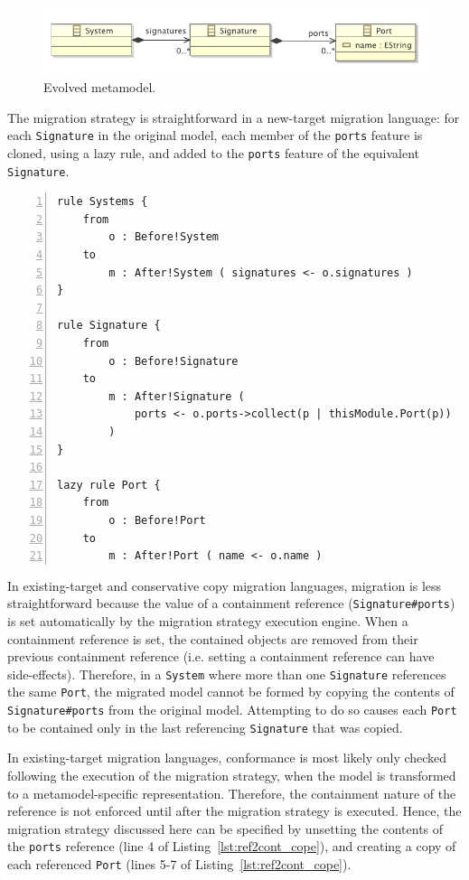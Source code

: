 \begin{figure}[htbp]
  \centering
  \includegraphics[scale=0.75]{6.Evaluation/images/change_ref_to_cont_after.pdf}
  \caption{Evolved metamodel.}
  \label{fig:ref2cont_evolved_mm}
\end{figure}

The migration strategy is straightforward in a new-target migration language: for each \texttt{Signature} in the original model, each member of the \texttt{ports} feature is cloned, using a lazy rule, and added to the \texttt{ports} feature of the equivalent \texttt{Signature}.

\begin{lstlisting}[basicstyle=\ttfamily\footnotesize, flexiblecolumns=true, numbers=left, nolol=true, caption=Change R to C model migration in ATL, label=lst:ref2cont_atl, language=ATL, tabsize=2]
rule Systems {
	from
		o : Before!System
	to
		m : After!System ( signatures <- o.signatures )
}

rule Signature {
	from
		o : Before!Signature
	to
		m : After!Signature (
			ports <- o.ports->collect(p | thisModule.Port(p))
		)
}

lazy rule Port {
	from
		o : Before!Port
	to
		m : After!Port ( name <- o.name )
\end{lstlisting}

In existing-target and conservative copy migration languages, migration is less straightforward because the value of a containment reference (\texttt{Signature\#ports}) is set automatically by the migration strategy execution engine. When a containment reference is set, the contained objects are removed from their previous containment reference (i.e. setting a containment reference can have side-effects). Therefore, in a \texttt{System} where more than one \texttt{Signature} references the same \texttt{Port}, the migrated model cannot be formed by copying the contents of \texttt{Signature\#ports} from the original model. Attempting to do so causes each \texttt{Port} to be contained only in the last referencing \texttt{Signature} that was copied.

In existing-target migration languages, conformance is most likely only checked following the execution of the migration strategy, when the model is transformed to a metamodel-specific representation. Therefore, the containment nature of the reference is not enforced until after the migration strategy is executed. Hence, the migration strategy discussed here can be specified by unsetting the contents of the \texttt{ports} reference (line 4 of Listing~\ref{lst:ref2cont_cope}), and creating a copy of each referenced \texttt{Port} (lines 5-7 of Listing~\ref{lst:ref2cont_cope}).

